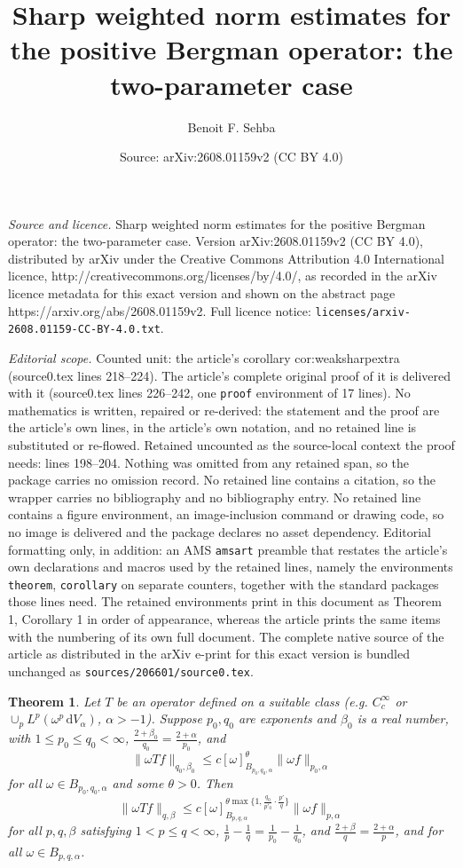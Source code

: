 \documentclass[10pt,a4paper]{amsart}
\title{Sharp weighted norm estimates for the positive Bergman operator: the two-parameter case}
\author{Benoit F. Sehba}
\date{Source: arXiv:2608.01159v2 (CC BY 4.0)}
\newtheorem{theorem}{Theorem}
\begin{document}
\maketitle

\noindent\emph{Source and licence.} Sharp weighted norm estimates for the positive Bergman operator: the two-parameter case. Version arXiv:2608.01159v2 (CC BY 4.0), distributed by arXiv under the Creative Commons Attribution 4.0 International licence, http://creativecommons.org/licenses/by/4.0/, as recorded in the arXiv licence metadata for this exact version and shown on the abstract page https://arxiv.org/abs/2608.01159v2. Full licence notice: \texttt{licenses/arxiv-2608.01159-CC-BY-4.0.txt}.\par\smallskip

\noindent\textit{Editorial scope.} Counted unit: the article's corollary cor:weaksharpextra (source0.tex lines 218--224). The article's complete original proof of it is delivered with it (source0.tex lines 226--242, one \texttt{proof} environment of 17 lines). No mathematics is written, repaired or re-derived: the statement and the proof are the article's own lines, in the article's own notation, and no retained line is substituted or re-flowed.  Retained uncounted as the source-local context the proof needs: lines 198--204.  Nothing was omitted from any retained span, so the package carries no omission record.  No retained line contains a citation, so the wrapper carries no bibliography and no bibliography entry.  No retained line contains a figure environment, an image-inclusion command or drawing code, so no image is delivered and the package declares no asset dependency.  Editorial formatting only, in addition: an AMS \texttt{amsart} preamble that restates the article's own declarations and macros used by the retained lines, namely the environments \texttt{theorem}, \texttt{corollary} on separate counters, together with the standard packages those lines need.  The retained environments print in this document as Theorem 1, Corollary 1 in order of appearance, whereas the article prints the same items with the numbering of its own full document.  The complete native source of the article as distributed in the arXiv e-print for this exact version is bundled unchanged as \texttt{sources/206601/source0.tex}.
\begin{theorem}\label{thm:sharpextra}
Let $T$ be an operator defined on a suitable class (e.g. $C_c^{\infty}$ or $\cup_p L^p(\omega^p\,\mathrm{d}V_{\alpha})$, $\alpha>-1$). Suppose $p_0,q_0$ are exponents and $\beta_0$ is a real number, with $1\le p_0\le q_0<\infty$, $\frac{2+\beta_0}{q_0}= \frac{2+\alpha}{p_0}$, and
$$\|\omega Tf\|_{q_0,\beta_0}\le c[\omega]^{\theta}_{B_{p_0,q_0,\alpha}}\|\omega f\|_{p_0,\alpha}$$
for all $\omega\in B_{p_0,q_0,\alpha}$ and some $\theta>0$. Then
$$\|\omega Tf\|_{q,\beta}\le c[\omega]^{\theta\max\{1,\frac{q_0}{p'_0}\cdot\frac{p'}{q}\}}_{B_{p,q,\alpha}}\|\omega f\|_{p,\alpha}$$
for all $p,q,\beta$ satisfying $1<p\le q<\infty$, $\frac{1}{p} - \frac{1}{q} = \frac{1}{p_0} - \frac{1}{q_0}$, and $\frac{2+\beta}{q} = \frac{2+\alpha}{p}$, and for all $\omega\in B_{p,q,\alpha}$.
\end{theorem}
\end{document}

